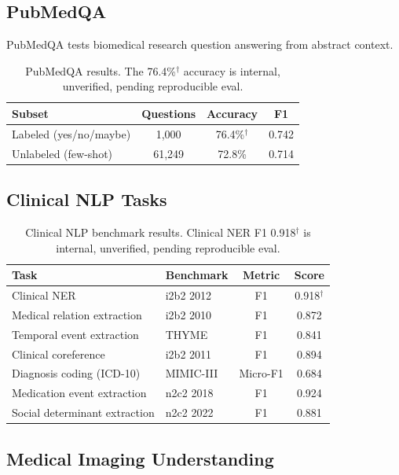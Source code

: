 \documentclass[11pt,a4paper]{article}
\begin{document}
\subsection{PubMedQA}

PubMedQA tests biomedical research question answering from abstract context.

\begin{table}[H]
\centering
\caption{PubMedQA results. The 76.4\%$^{\dagger}$ accuracy is internal, unverified, pending reproducible eval.}
\label{tab:pubmedqa}
\begin{tabular}{lccc}
\toprule
Subset & Questions & Accuracy & F1 \\
\midrule
Labeled (yes/no/maybe) & 1,000 & 76.4\%$^{\dagger}$ & 0.742 \\
Unlabeled (few-shot) & 61,249 & 72.8\% & 0.714 \\
\bottomrule
\end{tabular}
\end{table}

\subsection{Clinical NLP Tasks}

\begin{table}[H]
\centering
\caption{Clinical NLP benchmark results. Clinical NER F1 0.918$^{\dagger}$ is internal, unverified, pending reproducible eval.}
\label{tab:clinical_nlp}
\begin{tabular}{llcc}
\toprule
Task & Benchmark & Metric & Score \\
\midrule
Clinical NER & i2b2 2012 & F1 & 0.918$^{\dagger}$ \\
Medical relation extraction & i2b2 2010 & F1 & 0.872 \\
Temporal event extraction & THYME & F1 & 0.841 \\
Clinical coreference & i2b2 2011 & F1 & 0.894 \\
Diagnosis coding (ICD-10) & MIMIC-III & Micro-F1 & 0.684 \\
Medication event extraction & n2c2 2018 & F1 & 0.924 \\
Social determinant extraction & n2c2 2022 & F1 & 0.881 \\
\bottomrule
\end{tabular}
\end{table}

\subsection{Medical Imaging Understanding}
\end{document}
